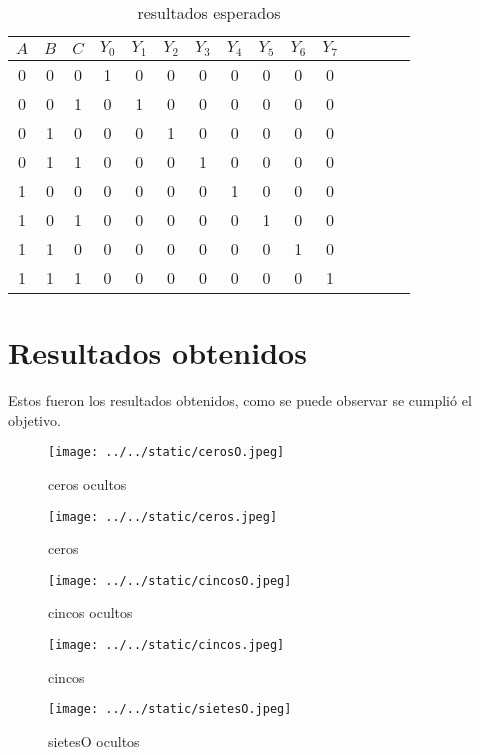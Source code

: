 \documentclass{article}
\begin{document}
\begin{table}[H]
	\centering
	\begin{tabular}{|c|c|c||c|c|c|c|c|c|c|c|c|c|c|c|}
\hline
$A$ & $B$ & $C$ & $Y_0$ & $Y_1$ & $Y_2$ & $Y_3$ & $Y_4$ & $Y_5$ & $Y_6$ & $Y_7$ \\
\hline
0 & 0 & 0 & 1 & 0 & 0 & 0 & 0 & 0 & 0 & 0 \\
\hline
0 & 0 & 1 & 0 & 1 & 0 & 0 & 0 & 0 & 0 & 0 \\
\hline
0 & 1 & 0 & 0 & 0 & 1 & 0 & 0 & 0 & 0 & 0 \\
\hline
0 & 1 & 1 & 0 & 0 & 0 & 1 & 0 & 0 & 0 & 0 \\
\hline
1 & 0 & 0 & 0 & 0 & 0 & 0 & 1 & 0 & 0 & 0 \\
\hline
1 & 0 & 1 & 0 & 0 & 0 & 0 & 0 & 1 & 0 & 0 \\
\hline
1 & 1 & 0 & 0 & 0 & 0 & 0 & 0 & 0 & 1 & 0 \\
\hline
1 & 1 & 1 & 0 & 0 & 0 & 0 & 0 & 0 & 0 & 1 \\
\hline
\end{tabular}	
\caption{resultados esperados}
\label{tab:1}
\end{table}
\section{Resultados obtenidos}\label{sec:resObtenidos}

Estos fueron los resultados obtenidos, como se puede observar se cumplió el objetivo.

\begin{figure}[H]
	\centering
	\texttt{[image: ../../static/cerosO.jpeg]}	
	\caption{ceros ocultos}
	\label{fig:1}	
\end{figure}

\begin{figure}[H]
	\centering
	\texttt{[image: ../../static/ceros.jpeg]}	
	\caption{ceros}
	\label{fig:2}	
\end{figure}

\begin{figure}[H]
	\centering
	\texttt{[image: ../../static/cincosO.jpeg]}	
	\caption{cincos ocultos}
	\label{fig:3}	
\end{figure}

\begin{figure}[H]
	\centering
	\texttt{[image: ../../static/cincos.jpeg]}	
	\caption{cincos}
	\label{fig:4}	
\end{figure}

\begin{figure}[H]
	\centering
	\texttt{[image: ../../static/sietesO.jpeg]}	
	\caption{sietesO ocultos}
	\label{fig:5}	
\end{figure}
\end{document}
